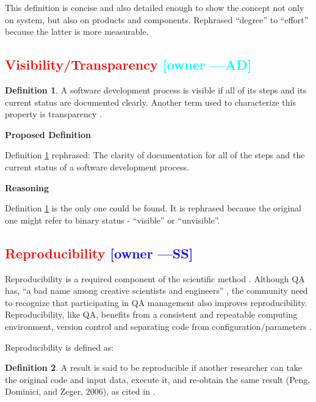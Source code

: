 \documentclass[letterpaper,cleveref]{lipics-v2019}
\newcommand{\authornote}[3]{\textcolor{#1}{[#3 ---#2]}}
\newcommand{\authornote}[3]{}
\newcommand{\wss}[1]{\authornote{blue}{SS}{#1}} %
\newcommand{\ad}[1]{\authornote{cyan}{AD}{#1}} %
\newcommand{\notdone}[1]{\textcolor{red}{#1}}
\theoremstyle{definition}
\newtheorem{defn}{Definition}
\begin{document}
This definition is concise and also detailed enough to show the concept not only
on system, but also on products and components. Rephrased ``degree'' to
``effort'' because the latter is more measurable.

\subsection{\notdone{Visibility/Transparency} \ad{owner}}

\begin{defn}
\label{VisibilitySelected}
A software development process is visible if all of its steps and its current
status are documented clearly. Another term used to characterize this property
is transparency \citep{ghezzi1991fundamentals}.
\end{defn}
      
\noindent \textbf{Proposed Definition} 

Definition \ref{VisibilitySelected} rephrased: The clarity of documentation for
all of the steps and the current status of a software development process.

\noindent \textbf{Reasoning}

Definition \ref{VisibilitySelected} is the only one could be found. It is
rephrased because the original one might refer to binary status - ``visible'' or
``unvisible''.

\subsection{\notdone{Reproducibility} \wss{owner}}

Reproducibility is a required component of the scientific
method \citep{Davison2012}.  Although QA has, ``a bad name among creative
scientists and engineers'' \citep[p.~352]{Roache1998}, the community need to
recognize that participating in QA management also improves reproducibility.
Reproducibility, like QA, benefits from a consistent and repeatable computing
environment, version control and separating code from
configuration/parameters \citep{Davison2012}.

Reproducibility is defined as:

\begin{defn}
A result is said to be reproducible if another researcher can take the original
code and input data, execute it, and re-obtain the same result (Peng, Dominici,
and Zeger, 2006), as cited in \citet{BenureauAndRougier2017}.
\end{defn}
\end{document}
